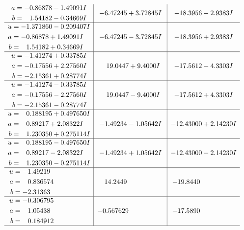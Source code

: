 \documentclass[1p]{elsarticle_modified}
\theoremstyle{definition}
\begin{document}
$$\begin{array}{c|c|c}
\begin{aligned}
a &= -0.86878 - 1.49091 I \\
b &= \phantom{-}1.54182 - 0.34669 I\end{aligned}
 & -6.47245 + 3.72845 I & -18.3956 - 2.9383 I \\ \hline\begin{aligned}
u &= -1.371860 - 0.209407 I \\
a &= -0.86878 + 1.49091 I \\
b &= \phantom{-}1.54182 + 0.34669 I\end{aligned}
 & -6.47245 - 3.72845 I & -18.3956 + 2.9383 I \\ \hline\begin{aligned}
u &= -1.41274 + 0.33785 I \\
a &= -0.17556 + 2.27560 I \\
b &= -2.15361 + 0.28774 I\end{aligned}
 & \phantom{-}19.0447 + 9.4000 I & -17.5612 - 4.3303 I \\ \hline\begin{aligned}
u &= -1.41274 - 0.33785 I \\
a &= -0.17556 - 2.27560 I \\
b &= -2.15361 - 0.28774 I\end{aligned}
 & \phantom{-}19.0447 - 9.4000 I & -17.5612 + 4.3303 I \\ \hline\begin{aligned}
u &= \phantom{-}0.188195 + 0.497650 I \\
a &= \phantom{-}0.89217 + 2.08322 I \\
b &= \phantom{-}1.230350 + 0.275114 I\end{aligned}
 & -1.49234 - 1.05642 I & -12.43000 + 2.14230 I \\ \hline\begin{aligned}
u &= \phantom{-}0.188195 - 0.497650 I \\
a &= \phantom{-}0.89217 - 2.08322 I \\
b &= \phantom{-}1.230350 - 0.275114 I\end{aligned}
 & -1.49234 + 1.05642 I & -12.43000 - 2.14230 I \\ \hline\begin{aligned}
u &= -1.49219\phantom{ +0.000000I} \\
a &= \phantom{-}0.836574\phantom{ +0.000000I} \\
b &= -2.31363\phantom{ +0.000000I}\end{aligned}
 & \phantom{-}14.2449\phantom{ +0.000000I} & -19.8440\phantom{ +0.000000I} \\ \hline\begin{aligned}
u &= -0.306795\phantom{ +0.000000I} \\
a &= \phantom{-}1.05438\phantom{ +0.000000I} \\
b &= \phantom{-}0.184912\phantom{ +0.000000I}\end{aligned}
 & -0.567629\phantom{ +0.000000I} & -17.5890\phantom{ +0.000000I}\\
 \hline 
 \end{array}$$\newpage\newpage\renewcommand{\arraystretch}{1}
\end{document}
